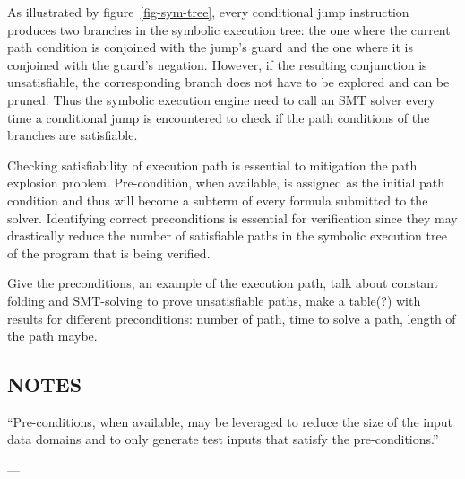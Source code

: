 As illustrated by figure~\ref{fig-sym-tree}, every conditional jump instruction produces
two branches in the symbolic execution tree: the one
where the current path condition is conjoined with the jump's guard and the one where it is
conjoined with the guard's negation. However, if the resulting
conjunction is unsatisfiable, the corresponding branch does not have to be explored
and can be pruned. Thus the symbolic execution engine need to call an SMT solver every
time a conditional jump is encountered to check if the path conditions of the branches
are satisfiable.

Checking satisfiability of execution path is essential to mitigation the path explosion
problem. Pre-condition, when available, is assigned as the initial path condition and thus
will become a subterm of every formula submitted to the solver. Identifying correct preconditions
is essential for verification since they may drastically reduce the number of satisfiable paths
in the symbolic execution tree of the program that is being verified.


Give the preconditions, an example of the execution path, talk about constant folding
and SMT-solving to prove unsatisfiable paths, make a table(?) with results for different
preconditions: number of path, time to solve a path, length of the path maybe.

\subsection{NOTES}

``Pre-conditions, when
available, may be leveraged to reduce the size of the input
data domains and to only generate test inputs that satisfy
the pre-conditions.''


---
